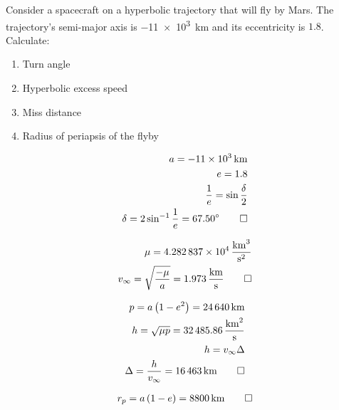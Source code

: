 \begin{hwkProblem}{5}{}

	Consider a spacecraft on a hyperbolic trajectory that will fly by Mars. The trajectory's semi-major axis is \qty{-11e3}{\km} and its eccentricity is \( 1.8 \). Calculate:
	\begin{enumerate}
		\item Turn angle
		\item Hyperbolic excess speed
		\item Miss distance
		\item Radius of periapsis of the flyby
	\end{enumerate}

	\hwkSol

	\hwkPart

	\begin{align*}
		a = \qty{-11e3}{\km} \\
		e = 1.8 \\
		\frac{1}{e} = \sin{\frac{\delta}{2}} \\
		\delta = 2 \sin^{-1}{\frac{1}{e}} = \qty{67.50}{\degree} \qed
	\end{align*}

	\hwkPart

	\begin{align*}
		\mu = \qty{4.282837e4}{\cubic\km\per\square\s} \\
		v_{\infty} = \sqrt{\frac{-\mu}{a}} = \qty{1.973}{\km\per\s} \qed
	\end{align*}

	\hwkPart

	\begin{align*}
		p = a \left( 1 - e^{2} \right) = \qty{24640}{\km} \\
		h = \sqrt{\mu p} = \qty{32485.86}{\square\km\per\s} \\
		h = v_{\infty} \Delta \\
		\Delta = \frac{h}{v_{\infty}} = \qty{16463}{\km} \qed
	\end{align*}

	\hwkPart

	\begin{align*}
		r_{p} = a \left( 1 - e \right) = \qty{8800}{\km} \qed
	\end{align*}

\end{hwkProblem}

